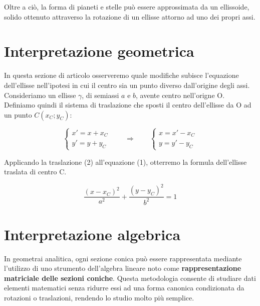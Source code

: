 \documentclass[10pt, a4paper]{article}
\theoremstyle{remark}
\begin{document}
	Oltre a ciò, la forma di pianeti e stelle può essere approssimata da un ellissoide, solido ottenuto attraverso la rotazione di un ellisse attorno ad uno dei propri assi.

	


	
	\section*{Interpretazione geometrica}
	
	In questa sezione di articolo osserveremo quale modifiche subisce l'equazione dell'ellisse nell'ipotesi in cui il centro sia un punto diverso dall'origine degli assi.\\
	
	Consideriamo un ellisse $\gamma$, di semiassi $a$ e $b$, avente centro nell'origne O. Definiamo quindi  il sistema di traslazione che sposti il centro dell'ellisse da O ad un punto $C(x_C;y_C)$:
	
	\begin{equation}
		\begin{cases} x'=x+x_C \\ y'=y+y_C \end{cases} \qquad \Rightarrow \qquad \begin{cases}
			x=x'-x_C \\ y= y'-y_C
		\end{cases}
	\end{equation}

	Applicando la traslazione (2) all'equazione (1), otterremo la formula dell'ellisse traslata di centro C.
	
	\begin{equation}
		\frac{(x-x_C)^2}{a^2} + \frac{(y-y_C)^2}{b^2} =1
	\end{equation}
	
	\section*{Interpretazione algebrica}
	
	In geometrai analitica, ogni sezione conica può essere rappresentata mediante l'utilizzo di uno strumento dell'algebra lineare noto come \textbf{rappresentazione matriciale delle sezioni coniche}. Questa metodologia consente di studiare dati elementi matematici senza ridurre essi ad una forma canonica condizionata da rotazioni o traslazioni, rendendo lo studio molto più semplice. \\
	
\end{document}

